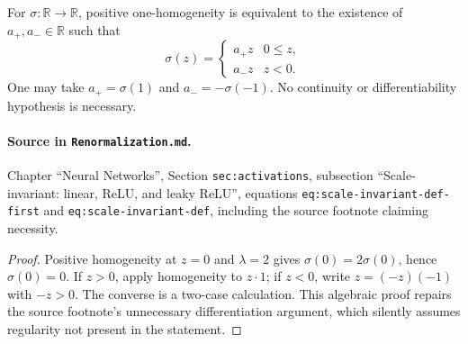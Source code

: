 \begin{theorem}
\label{thm:renorm:posHomogeneousClassification}
For $\sigma:\mathbb R\to\mathbb R$, positive one-homogeneity is equivalent to the existence of
$a_+,a_-\in\mathbb R$ such that
\[
  \sigma(z)=\begin{cases}a_+z&0\le z,\\a_-z&z<0.\end{cases}
\]
One may take $a_+=\sigma(1)$ and $a_-=-\sigma(-1)$.  No continuity or differentiability hypothesis
is necessary.

\paragraph{Source in \texttt{Renormalization.md}.}
Chapter ``Neural Networks'', Section \texttt{sec:activations}, subsection ``Scale-invariant: linear,
ReLU, and leaky ReLU'', equations \texttt{eq:scale-invariant-def-first} and
\texttt{eq:scale-invariant-def}, including the source footnote claiming necessity.
\end{theorem}

\begin{proof}
Positive homogeneity at $z=0$ and $\lambda=2$ gives $\sigma(0)=2\sigma(0)$, hence
$\sigma(0)=0$.  If $z>0$, apply homogeneity to $z\cdot1$; if $z<0$, write
$z=(-z)(-1)$ with $-z>0$.  The converse is a two-case calculation.  This algebraic proof repairs
the source footnote's unnecessary differentiation argument, which silently assumes regularity not
present in the statement.
\end{proof}


